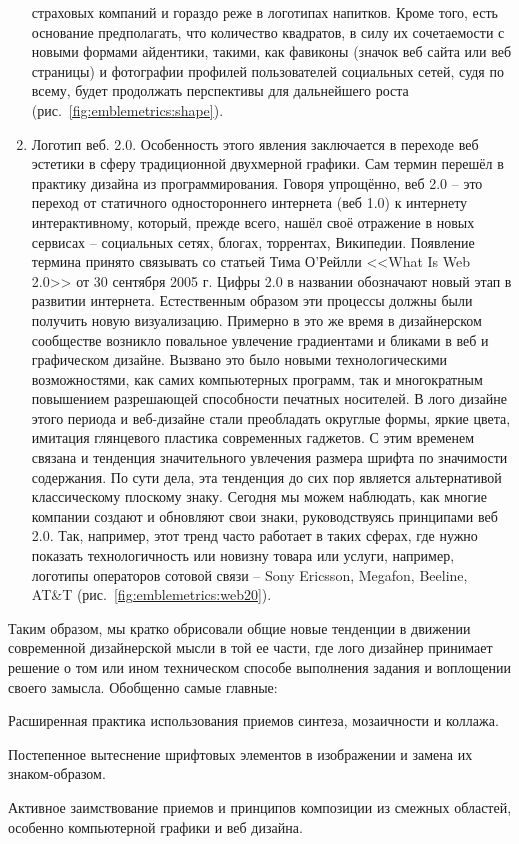 \begin{enumerate}
  страховых компаний и гораздо реже в логотипах напитков. Кроме того, есть основание предполагать,
  что количество квадратов, в силу их сочетаемости  с новыми формами айдентики, такими, как фавиконы
  (значок веб сайта или веб страницы) и фотографии профилей пользователей социальных сетей, судя по
  всему, будет продолжать  перспективы  для дальнейшего роста (рис.~\ref{fig:emblemetrics:shape}).
\item Логотип веб. 2.0. Особенность этого явления  заключается в переходе веб эстетики в сферу
  традиционной двухмерной графики. Сам термин перешёл в практику дизайна из
  программирования. Говоря упрощённо, веб 2.0 -- это переход от статичного одностороннего интернета
  (веб 1.0) к интернету интерактивному, который, прежде всего, нашёл своё отражение в новых сервисах
  -- социальных сетях, блогах, торрентах, Википедии. Появление термина принято связывать со статьей
  Тима О'Рейлли <<What Is Web 2.0>> от 30 сентября 2005 г. Цифры 2.0 в названии обозначают новый
  этап в развитии интернета. Естественным образом эти процессы должны были получить новую
  визуализацию. Примерно в это же время в дизайнерском сообществе возникло повальное увлечение
  градиентами и бликами в веб и графическом дизайне. Вызвано это было новыми технологическими
  возможностями, как самих компьютерных программ, так и многократным повышением разрешающей
  способности печатных носителей. В лого дизайне этого периода и веб-дизайне стали преобладать
  округлые формы, яркие цвета, имитация глянцевого пластика современных гаджетов. С этим временем
  связана и тенденция значительного увлечения размера шрифта по значимости содержания. По сути дела,
  эта тенденция до сих пор является альтернативой классическому плоскому знаку. Сегодня мы можем
  наблюдать, как многие компании создают и обновляют свои знаки, руководствуясь принципами веб
  2.0. Так, например, этот тренд часто работает в таких сферах, где нужно показать технологичность
  или новизну товара или услуги, например, логотипы операторов сотовой связи -- Sony Ericsson,
  Megafon, Beeline, AT\&T (рис.~\ref{fig:emblemetrics:web20}).
\end{enumerate}

Таким образом, мы кратко обрисовали общие новые тенденции в движении современной дизайнерской мысли
в той ее части, где лого дизайнер принимает решение о том или ином техническом способе выполнения
задания и воплощении своего замысла. Обобщенно самые главные:
\begin{enumerate*}[label=\arabic*)]
\item Расширенная практика использования приемов синтеза, мозаичности и коллажа.
\item Постепенное вытеснение шрифтовых элементов в изображении и замена их знаком-образом.
\item Активное заимствование приемов и принципов композиции из смежных областей, особенно компьютерной графики и веб дизайна.
\end{enumerate*}

